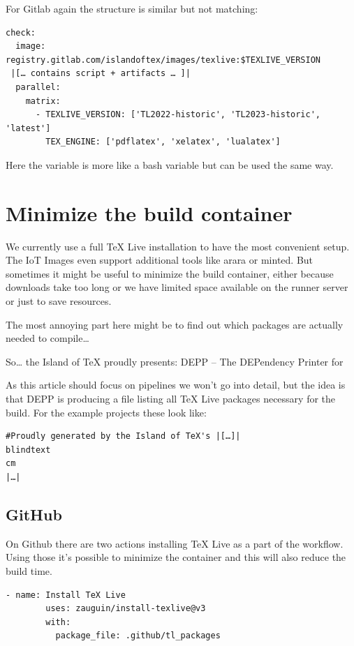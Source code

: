 \documentclass[final]{ltugboat}
\newcommand*{\TeXLive}{\acro{\TeX\,Live}}
\begin{document}
For Gitlab again the structure is similar but not matching:

\begin{verbatim}
check:
  image: registry.gitlab.com/islandoftex/images/texlive:$TEXLIVE_VERSION
 |[… contains script + artifacts … ]|
  parallel:
    matrix:
      - TEXLIVE_VERSION: ['TL2022-historic', 'TL2023-historic', 'latest']
        TEX_ENGINE: ['pdflatex', 'xelatex', 'lualatex']
\end{verbatim}

Here the variable is more like a bash variable but can be used the same way.


\section{Minimize the build container}
We currently use a full TeX Live installation to have the most convenient setup.
The IoT Images even support additional tools like arara or minted.
But sometimes it might be useful to minimize the build container, either because downloads take too long or we have limited space available on the runner server or just to save resources.

The most annoying part here might be to find out which packages are actually needed to compile…

So… the Island of TeX proudly presents: DEPP – The DEPendency Printer for \TeXLive\cite{depp}

As this article should focus on pipelines we won't go into detail, but the idea is that DEPP is producing a file listing all TeX Live packages necessary for the build.
For the example projects these look like:

\begin{verbatim}
#Proudly generated by the Island of TeX's |[…]|
blindtext
cm
|…|
\end{verbatim}

\subsection{GitHub}

On Github there are two actions installing TeX Live as a part of the workflow.
Using those it's possible to minimize the container and this will also reduce the build time.

\begin{verbatim}
- name: Install TeX Live
        uses: zauguin/install-texlive@v3
        with:
          package_file: .github/tl_packages
\end{verbatim}
\end{document}
